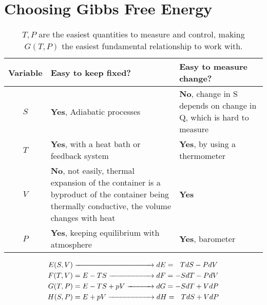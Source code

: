 \documentclass{article}
\begin{document}
\section*{Choosing Gibbs Free Energy}
    \begin{table}[H]
        \renewcommand{\arraystretch}{1.5}
        \centering
        \begin{tabular}{|c|m{5.5cm}|m{5cm}|}
            \hline
            Variable & Easy to keep fixed? & Easy to measure change? 
            \\\hline
            $S$ & \textcolor{SpringGreen3}{\textbf{Yes}}, Adiabatic processes & \textcolor{OrangeRed3}{\textbf{No}}, change in S depends on change in Q, which is hard to measure
            \\\hline
            $T$ & \textcolor{SpringGreen3}{\textbf{Yes}}, with a heat bath or feedback system& \textcolor{SpringGreen3}{\textbf{Yes}}, by using a thermometer
            \\\hline
            $V$ & \textcolor{OrangeRed3}{\textbf{No}}, not easily, thermal expansion of the container is a byproduct of the container being thermally conductive, the volume changes with heat & \textcolor{SpringGreen3}{\textbf{Yes}}
            \\\hline
            $P$ & \textcolor{SpringGreen3}{\textbf{Yes}}, keeping equilibrium with atmosphere & \textcolor{SpringGreen3}{\textbf{Yes}}, barometer
            \\\hline
        \end{tabular}
        \caption{$T,P$ are the easiest quantities to measure and control, making $G(T,P)$ the easiest fundamental relationship to work with.}
    \end{table}
    \begin{align*}
        E(S,V)&\xrightarrow{\hspace{3.67cm}} dE= ~~ TdS-PdV %
        \\
        F(T,V)&=E-TS \xrightarrow{\hspace{2cm}} dF= -SdT-PdV
        \\
        G(T,P)&=E-TS+pV \xrightarrow{\hspace{1.11cm}} dG= -SdT+VdP
        \\
        H(S,P)&=E+pV\xrightarrow{\hspace{2.04cm}} dH= ~~ TdS+VdP
    \end{align*}
    \newpage
\end{document}
